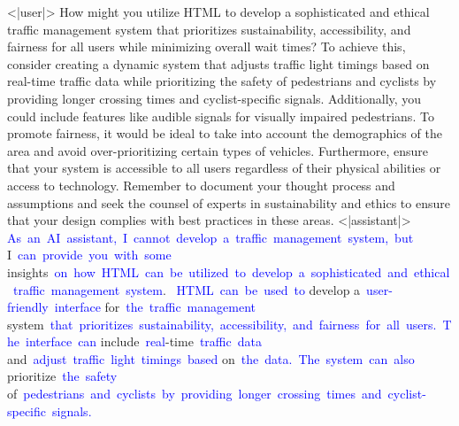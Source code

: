 \documentclass{article}
\begin{document}
\begin{tcolorbox}[colframe=black,colback=white]
<|user|>
How might you utilize HTML to develop a sophisticated and ethical traffic management system that prioritizes sustainability, accessibility, and fairness for all users while minimizing overall wait times? To achieve this, consider creating a dynamic system that adjusts traffic light timings based on real-time traffic data while prioritizing the safety of pedestrians and cyclists by providing longer crossing times and cyclist-specific signals. Additionally, you could include features like audible signals for visually impaired pedestrians. To promote fairness, it would be ideal to take into account the demographics of the area and avoid over-prioritizing certain types of vehicles. Furthermore, ensure that your system is accessible to all users regardless of their physical abilities or access to technology. Remember to document your thought process and assumptions and seek the counsel of experts in sustainability and ethics to ensure that your design complies with best practices in these areas.
<|assistant|>
\textcolor{blue}{As}\textcolor{blue}{~an}\textcolor{blue}{~AI}\textcolor{blue}{~assistant}\textcolor{blue}{,}\textcolor{blue}{~I}\textcolor{blue}{~cannot}\textcolor{blue}{~develop}\textcolor{blue}{~a}\textcolor{blue}{~traffic}\textcolor{blue}{~management}\textcolor{blue}{~system}\textcolor{blue}{,}\textcolor{blue}{~but} I\textcolor{blue}{~can}\textcolor{blue}{~provide}\textcolor{blue}{~you}\textcolor{blue}{~with}\textcolor{blue}{~some} insights\textcolor{blue}{~on}\textcolor{blue}{~how}\textcolor{blue}{~HTML}\textcolor{blue}{~can}\textcolor{blue}{~be}\textcolor{blue}{~utilized}\textcolor{blue}{~to}\textcolor{blue}{~develop}\textcolor{blue}{~a}\textcolor{blue}{~sophisticated}\textcolor{blue}{~and}\textcolor{blue}{~ethical}\textcolor{blue}{~traffic}\textcolor{blue}{~management}\textcolor{blue}{~system}.\textcolor{blue}{~
}\textcolor{blue}{HTML}\textcolor{blue}{~can}\textcolor{blue}{~be}\textcolor{blue}{~used}\textcolor{blue}{~to} develop a\textcolor{blue}{~user}\textcolor{blue}{-friendly}\textcolor{blue}{~interface} for\textcolor{blue}{~the}\textcolor{blue}{~traffic}\textcolor{blue}{~management} system\textcolor{blue}{~that}\textcolor{blue}{~priorit}\textcolor{blue}{izes}\textcolor{blue}{~sustainability}\textcolor{blue}{,}\textcolor{blue}{~accessibility}\textcolor{blue}{,}\textcolor{blue}{~and}\textcolor{blue}{~fairness}\textcolor{blue}{~for}\textcolor{blue}{~all}\textcolor{blue}{~users}\textcolor{blue}{.}\textcolor{blue}{~The}\textcolor{blue}{~interface}\textcolor{blue}{~can} include\textcolor{blue}{~real}-time\textcolor{blue}{~traffic}\textcolor{blue}{~data} and\textcolor{blue}{~adjust}\textcolor{blue}{~traffic}\textcolor{blue}{~light}\textcolor{blue}{~timings}\textcolor{blue}{~based} on\textcolor{blue}{~the}\textcolor{blue}{~data}\textcolor{blue}{.}\textcolor{blue}{~The}\textcolor{blue}{~system}\textcolor{blue}{~can}\textcolor{blue}{~also} prioritize\textcolor{blue}{~the}\textcolor{blue}{~safety} of\textcolor{blue}{~pedestrians}\textcolor{blue}{~and}\textcolor{blue}{~cyclists}\textcolor{blue}{~by}\textcolor{blue}{~providing}\textcolor{blue}{~longer}\textcolor{blue}{~crossing}\textcolor{blue}{~times}\textcolor{blue}{~and}\textcolor{blue}{~cyclist}\textcolor{blue}{-specific}\textcolor{blue}{~signals}\textcolor{blue}{.
}
\end{tcolorbox}
\end{document}
